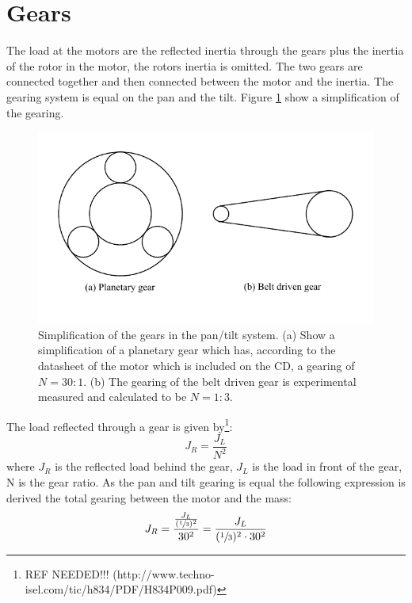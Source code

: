 \section{Gears}
The load at the motors are the reflected inertia through the gears plus the inertia of the rotor in the motor, the rotors inertia is omitted. The two gears are connected together and then connected between the motor and the inertia. The gearing system is equal on the pan and the tilt. Figure \ref{fig:app_gears} show a simplification of the gearing.
\begin{figure}[htb]
	\centering
	\includegraphics[scale=1,trim=0 20 0 10]{graphics/gears.pdf} %
	\caption{Simplification of the gears in the pan/tilt system. (a) Show a simplification of a planetary gear which has, according to the datasheet of the motor which is included on the CD, a gearing of $N = 30:1$. (b) The gearing of the belt driven gear is experimental measured and calculated to be $N = 1:3$.}
	\label{fig:app_gears}			%
\end{figure}
The load reflected through a gear is given by\footnote{REF NEEDED!!!   (http://www.techno-isel.com/tic/h834/PDF/H834P009.pdf)}:
\begin{equation}
	J_R = \frac{J_L}{N^{2}}
\end{equation}
where $J_R$ is the reflected load behind the gear, $J_L$ is the load in front of the gear, N is the gear ratio. As the pan and tilt gearing is equal the following expression is derived the total gearing between the motor and the mass:
\begin{equation}
	J_R = \frac{\frac{J_L}{(\sfrac{1}{3})^{2}}}{30^{2}} = \frac{J_L}{(\sfrac{1}{3})^{2} \cdot 30^{2}}\label{app:eq_reflected_inertia_temp}
\end{equation}

